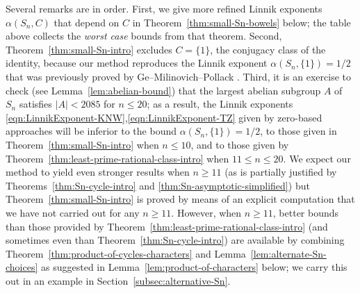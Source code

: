 \documentclass[12pt]{amsart}
\theoremstyle{definition} \newtheorem{definition}[theorem]{Definition}
\theoremstyle{example} \newtheorem{example}[theorem]{Example}
\theoremstyle{remark} \newtheorem{remark}{Remark}[theorem]
\numberwithin{equation}{section}
\numberwithin{theorem}{section}
\renewcommand{\leq}{\leqslant}
\renewcommand{\geq}{\geqslant}
\begin{document}
	Several remarks are in order.  First, we give more refined Linnik exponents $\alpha(S_n,C)$ that depend on $C$ in Theorem~\ref{thm:small-Sn-bowels} below; the table above collects the \emph{worst case} bounds from that theorem.  Second, Theorem~\ref{thm:small-Sn-intro} excludes $C = \{1\}$, the conjugacy class of the identity, because our method reproduces the Linnik exponent $\alpha(S_n,\{1\}) = 1/2$ that was previously proved by Ge--Milinovich--Pollack \cite{GeMilinovichPollack-Split}. Third, it is an exercise to check (see Lemma~\ref{lem:abelian-bound}) that the largest abelian subgroup $A$ of $S_n$  satisfies $|A| < 2085$ for $n \leq 20$; as a result, the Linnik exponents \eqref{eqn:LinnikExponent-KNW},\eqref{eqn:LinnikExponent-TZ} given by zero-based approaches will be inferior to the bound $\alpha(S_n,\{1\}) = 1/2$, to those given in Theorem~\ref{thm:small-Sn-intro} when $n \leq 10$, and to those given by Theorem~\ref{thm:least-prime-rational-class-intro} when $11 \leq n \leq 20$.  We expect our method to yield even stronger results when $n \geq 11$ (as is partially justified by Theorems~\ref{thm:Sn-cycle-intro} and \ref{thm:Sn-asymptotic-simplified}) but Theorem~\ref{thm:small-Sn-intro} is proved by means of an explicit computation that we have not carried out for any $n \geq 11$.  However, when $n \geq 11$, better bounds than those provided by Theorem~\ref{thm:least-prime-rational-class-intro} (and sometimes even than Theorem~\ref{thm:Sn-cycle-intro}) are available by combining Theorem~\ref{thm:product-of-cycles-characters} and Lemma~\ref{lem:alternate-Sn-choices} as suggested in Lemma~\ref{lem:product-of-characters} below; we carry this out in an example in Section~\ref{subsec:alternative-Sn}.
	
\end{document}
